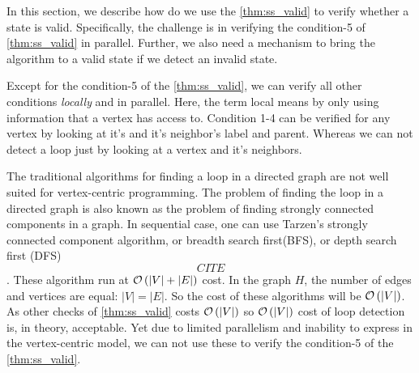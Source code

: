 %

In this section, we describe how do we use the  \cref{thm:ss_valid} to verify
whether a state is valid. Specifically, the challenge is in verifying the
condition-5 of \cref{thm:ss_valid} in parallel. Further, we also need a
mechanism to bring the algorithm to a valid state if we detect an invalid
state.


Except for the condition-5 of the \cref{thm:ss_valid}, we can verify all other
conditions \emph{locally} and in parallel.  Here, the term local means by only
using information that a vertex has access to. Condition 1-4 can be verified
for any vertex by looking at it's  and it's neighbor's label and parent.
Whereas we can not detect a loop just by looking at a vertex and it's
neighbors.

The traditional algorithms for finding a loop in a directed graph are not well
suited for vertex-centric programming. The problem of finding the loop in a
directed graph is also known as the problem of finding strongly connected
components in a graph. In sequential case, one can use Tarzen's strongly
connected component algorithm, or breadth search first(BFS), or depth search
first (DFS) \[CITE\].  These algorithm run at $\mathcal{O} \left ( |V| + |E| \right )$ cost.  In the
graph $H$, the number of edges and vertices are equal: $|V|=|E|$. So the cost
of these algorithms will be $\mathcal{O} \left ( |V|  \right )$. As other checks of
\cref{thm:ss_valid} costs $\mathcal{O} \left ( |V|  \right )$ so $\mathcal{O} \left ( |V|  \right )$ cost of loop
detection is, in theory, acceptable.  Yet due to limited parallelism and
inability to express in the vertex-centric model, we can not use these to
verify the condition-5 of the \cref{thm:ss_valid}.
